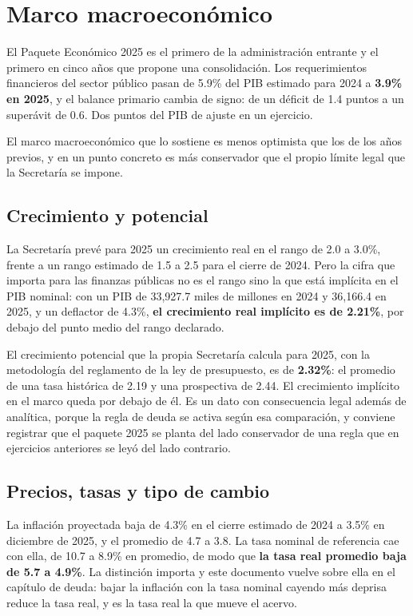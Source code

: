\chapter{Marco macroeconómico}

El Paquete Económico 2025 es el primero de la administración entrante y el primero
en cinco años que propone una consolidación. Los requerimientos financieros del
sector público pasan de 5.9\% del PIB estimado para 2024 a \textbf{3.9\% en 2025},
y el balance primario cambia de signo: de un déficit de 1.4 puntos a un superávit
de 0.6. Dos puntos del PIB de ajuste en un ejercicio.

El marco macroeconómico que lo sostiene es menos optimista que los de los años
previos, y en un punto concreto es más conservador que el propio límite legal que
la Secretaría se impone.



\section{Crecimiento y potencial}

La Secretaría prevé para 2025 un crecimiento real en el rango de 2.0 a 3.0\%,
frente a un rango estimado de 1.5 a 2.5 para el cierre de 2024. Pero la cifra que
importa para las finanzas públicas no es el rango sino la que está implícita en el
PIB nominal: con un PIB de 33,927.7 miles de millones en 2024 y 36,166.4 en 2025,
y un deflactor de 4.3\%, \textbf{el crecimiento real implícito es de 2.21\%}, por
debajo del punto medio del rango declarado.

El crecimiento potencial que la propia Secretaría calcula para 2025, con la
metodología del reglamento de la ley de presupuesto, es de \textbf{2.32\%}: el
promedio de una tasa histórica de 2.19 y una prospectiva de 2.44. El crecimiento
implícito en el marco queda por debajo de él. Es un dato con consecuencia legal
además de analítica, porque la regla de deuda se activa según esa comparación, y
conviene registrar que el paquete 2025 se planta del lado conservador de una regla
que en ejercicios anteriores se leyó del lado contrario.

\section{Precios, tasas y tipo de cambio}

La inflación proyectada baja de 4.3\% en el cierre estimado de 2024 a 3.5\% en
diciembre de 2025, y el promedio de 4.7 a 3.8. La tasa nominal de referencia cae
con ella, de 10.7 a 8.9\% en promedio, de modo que \textbf{la tasa real promedio
baja de 5.7 a 4.9\%}. La distinción importa y este documento vuelve sobre ella en
el capítulo de deuda: bajar la inflación con la tasa nominal cayendo más deprisa
reduce la tasa real, y es la tasa real la que mueve el acervo.

